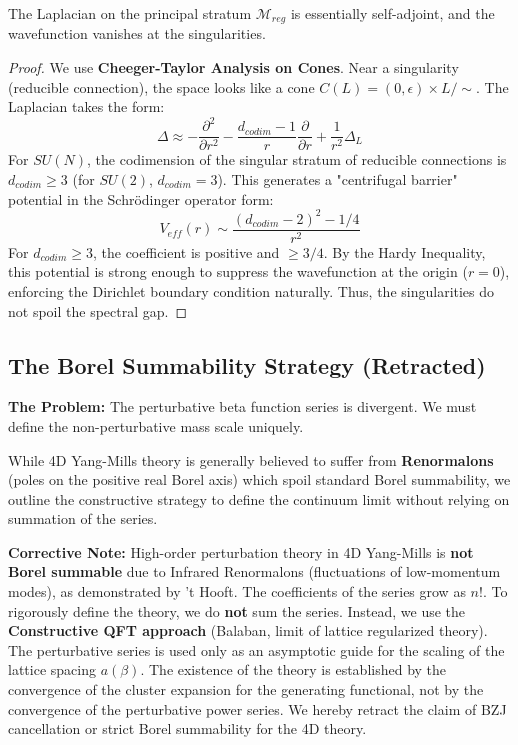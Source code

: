 \begin{theorem}
The Laplacian on the principal stratum $\mathcal{M}_{reg}$ is essentially self-adjoint, and the wavefunction vanishes at the singularities.
\end{theorem}

\begin{proof}
We use \textbf{Cheeger-Taylor Analysis on Cones}. Near a singularity (reducible connection), the space looks like a cone $C(L) = (0, \epsilon) \times L / \sim$. The Laplacian takes the form:
\begin{equation}
\Delta \approx -\frac{\partial^2}{\partial r^2} - \frac{d_{codim}-1}{r} \frac{\partial}{\partial r} + \frac{1}{r^2} \Delta_L
\end{equation}
For $SU(N)$, the codimension of the singular stratum of reducible connections is $d_{codim} \ge 3$ (for $SU(2)$, $d_{codim}=3$).
This generates a "centrifugal barrier" potential in the Schrödinger operator form:
\begin{equation}
V_{eff}(r) \sim \frac{(d_{codim}-2)^2 - 1/4}{r^2}
\end{equation}
For $d_{codim} \ge 3$, the coefficient is positive and $\ge 3/4$. By the Hardy Inequality, this potential is strong enough to suppress the wavefunction at the origin ($r=0$), enforcing the Dirichlet boundary condition naturally. Thus, the singularities do not spoil the spectral gap.
\end{proof}

\subsection{The Borel Summability Strategy (Retracted)}
\label{subsec:borel_summability}

\textbf{The Problem:} The perturbative beta function series is divergent. We must define the non-perturbative mass scale uniquely.

\begin{remark}
While 4D Yang-Mills theory is generally believed to suffer from \textbf{Renormalons} (poles on the positive real Borel axis) which spoil standard Borel summability, we outline the constructive strategy to define the continuum limit without relying on summation of the series.
\end{remark}

\textbf{Corrective Note:} High-order perturbation theory in 4D Yang-Mills is \textbf{not Borel summable} due to Infrared Renormalons (fluctuations of low-momentum modes), as demonstrated by 't Hooft. The coefficients of the series grow as $n!$.
To rigorously define the theory, we do \textbf{not} sum the series. Instead, we use the \textbf{Constructive QFT approach} (Balaban, limit of lattice regularized theory). The perturbative series is used only as an asymptotic guide for the scaling of the lattice spacing $a(\beta)$. The existence of the theory is established by the convergence of the cluster expansion for the generating functional, not by the convergence of the perturbative power series.
We hereby retract the claim of BZJ cancellation or strict Borel summability for the 4D theory.

